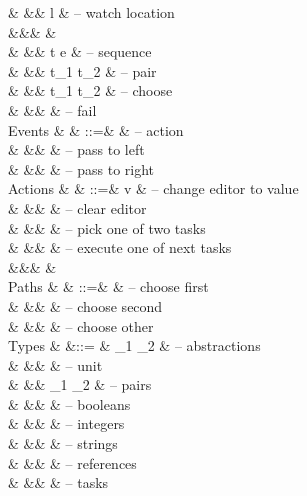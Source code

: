 \begin{grammar}
    &        &\mid& \Watch l                    & – watch location \\
    &&\grayed{\mid}&           &  \\
    &        &\mid& t \When e                   & – sequence \\
    &        &\mid& t_1 \And t_2                & – pair \\
    &        &\mid& t_1 \Or t_2                 & – choose \\
    &        &\mid& \Fail                       & – fail \\
  Events
    & \eta   & ::=& \alpha                      & – action \\
    &        &\mid& \Left \eta                  & – pass to left \\
    &        &\mid& \Right \eta                 & – pass to right \\
  Actions
    & \alpha & ::=& v                           & – change editor to value \\
    &        &\mid& \Clear                      & – clear editor \\
    &        &\mid& \Pick \pi                   & – pick one of two tasks \\
    &        &\mid& \Execute \pi                & – execute one of next tasks \\
    &&\grayed{\mid}& \grayed{\Next}             &  \\
  Paths
    & \pi    & ::=& \First                      & – choose first \\
    &        &\mid& \Second                     & – choose second \\
    &        &\mid& \Other \pi                  & – choose other \\
  Types
    & \tau   &::= & \tau_1 \to \tau_2           & – abstractions \\
    &        &\mid& \Unit                       & – unit \\
    &        &\mid& \tau_1 \times \tau_2        & – pairs \\
    &        &\mid& \Bool                       & – booleans \\
    &        &\mid& \Int                        & – integers \\
    &        &\mid& \String                     & – strings \\
    &        &\mid& \Reference \tau             & – references \\
    &        &\mid& \Task \tau                  & – tasks \\
\end{grammar}


